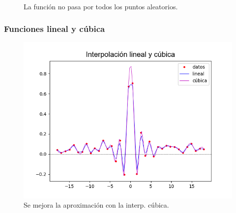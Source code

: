 {\begin{frame}
\begin{figure}
\caption{La función no pasa por todos los puntos aleatorios.}
\end{figure}
\end{frame}
\begin{frame}
\frametitle{Funciones lineal y cúbica}
\begin{figure}
\includegraphics[scale=0.55]{Imagenes/Interpolacion_sinc_03}
\caption{Se mejora la aproximación con la interp. cúbica.}
\end{figure}
\end{frame}
}
